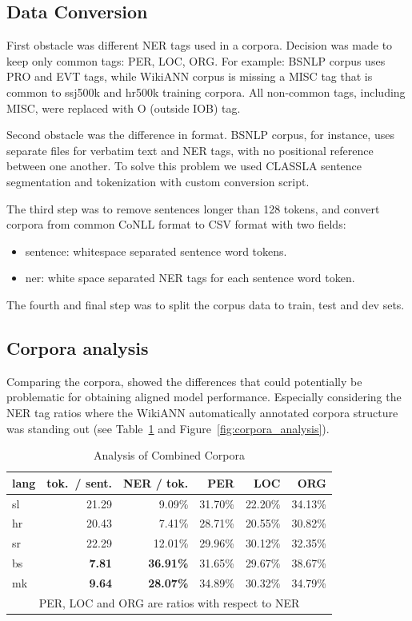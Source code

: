 \documentclass[sigconf]{acmart}
\begin{document}
\subsection{Data Conversion}
\label{subsec:data-conversion}
First obstacle was different NER tags used in a corpora.
Decision was made to keep only common tags: PER, LOC, ORG\@.
For example: BSNLP corpus uses PRO and EVT tags, while WikiANN corpus is missing a MISC tag that is common to ssj500k and hr500k training corpora.
All non-common tags, including MISC, were replaced with O (outside IOB) tag.

Second obstacle was the difference in format.
BSNLP corpus, for instance, uses separate files for verbatim text and NER tags, with no positional reference between one another.
To solve this problem we used CLASSLA\cite{ljubesic-dobrovoljc-2019-neural} sentence segmentation and tokenization with custom conversion script.

The third step was to remove sentences longer than 128 tokens, and convert corpora from common CoNLL format to CSV format with two fields:
\begin{itemize}
  \item sentence: whitespace separated sentence word tokens.
  \item ner: white space separated NER tags for each sentence word token.
\end{itemize}

The fourth and final step was to split the corpus data to train, test and dev sets.

\subsection{Corpora analysis}
\label{subsec:corpora-analysis}
Comparing the corpora, showed the differences that could potentially be problematic for obtaining aligned model performance.
Especially considering the NER tag ratios where the WikiANN automatically annotated corpora structure was standing
out (see Table~\ref{tab:corpora_analysis} and Figure~\ref{fig:corpora_analysis}).
\begin{table}[H]
  \caption{Analysis of Combined Corpora}
  \label{tab:corpora_analysis}
  \begin{tabular}{lrrrrr}
    \toprule
    lang&tok.\ / sent.&NER / tok.&PER&LOC&ORG\\
    \midrule
    sl&21.29&9.09\%&31.70\%&22.20\%&34.13\%\\
    hr&20.43&7.41\%&28.71\%&20.55\%&30.82\%\\
    sr&22.29&12.01\%&29.96\%&30.12\%&32.35\%\\
    bs&\textbf{7.81}&\textbf{36.91\%}&31.65\%&29.67\%&38.67\%\\
    mk&\textbf{9.64}&\textbf{28.07\%}&34.89\%&30.32\%&34.79\%\\
    \bottomrule
    \multicolumn{6}{c}{PER, LOC and ORG are ratios with respect to NER}
  \end{tabular}
\end{table}
\end{document}
